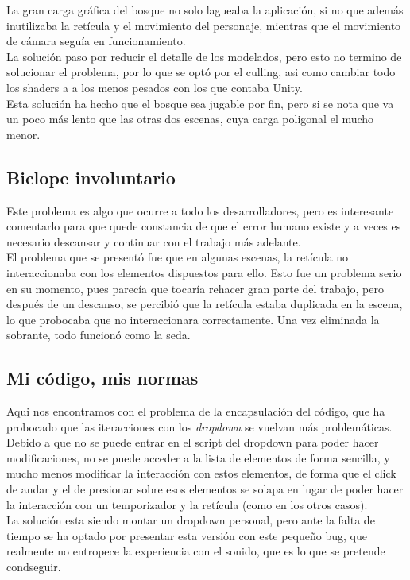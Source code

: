 \quad La gran carga gráfica del bosque no solo lagueaba la aplicación, si no que además inutilizaba la retícula y el movimiento del personaje, mientras que el movimiento de cámara seguía en funcionamiento.\\

\quad La solución paso por reducir el detalle de los modelados, pero esto no termino de solucionar el problema, por lo que se optó por el culling, asi como cambiar todo los shaders a a los menos pesados con los que contaba Unity.\\

\quad Esta solución ha hecho que el bosque sea jugable por fin, pero si se nota que va un poco más lento que las otras dos escenas, cuya carga poligonal el mucho menor.\\  

\subsection{Biclope involuntario}

\quad Este problema es algo que ocurre a todo los desarrolladores, pero es interesante comentarlo para que quede constancia de que el error humano existe y a veces es necesario descansar y continuar con el trabajo más adelante.\\

\quad El problema que se presentó fue que en algunas escenas, la retícula no interaccionaba con los elementos dispuestos para ello. Esto fue un problema serio en su momento, pues parecía que tocaría rehacer gran parte del trabajo, pero después de un descanso, se percibió que la retícula estaba duplicada en la escena, lo que probocaba que no interaccionara correctamente. Una vez eliminada la sobrante, todo funcionó como la seda.\\

\subsection{Mi código, mis normas}

\quad Aqui nos encontramos con el problema de la encapsulación del código, que ha probocado que las iteracciones con los \textit{dropdown} se vuelvan más problemáticas.\\

\quad Debido a que no se puede entrar en el script del dropdown para poder hacer modificaciones, no se puede acceder a la lista de elementos de forma sencilla, y mucho menos modificar la interacción con estos elementos, de forma que el click de andar y el de presionar sobre esos elementos se solapa en lugar de poder hacer la interacción con un temporizador y la retícula (como en los otros casos).\\

\quad La solución esta siendo montar un dropdown personal, pero ante la falta de tiempo se ha optado por presentar esta versión con este pequeño bug, que realmente no entropece la experiencia con el sonido, que es lo que se pretende condseguir.\\



\newpage






